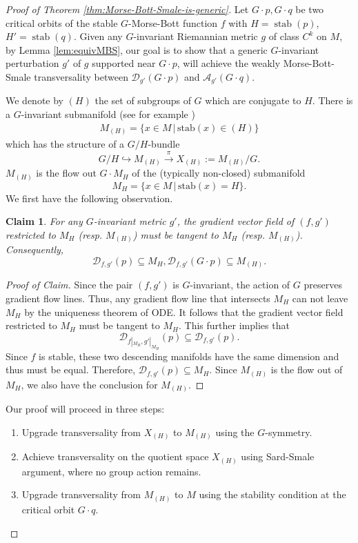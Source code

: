 \documentclass[11pt]{amsart}
\newtheorem{claim}[theorem]{Claim}
\theoremstyle{definition}
\numberwithin{equation}{subsection}
\DeclareMathOperator{\stab}{stab}
\newcommand{\des}{\mathscr{D}}
\newcommand{\asc}{\mathscr{A}}
\begin{document}
\begin{proof}[Proof of Theorem \ref{thm:Morse-Bott-Smale-is-generic}]
    Let \(G\cdot p,G\cdot q\) be two critical orbits of the stable $G$-Morse-Bott function $f$ with \(H=\stab(p)\), \(H'=\stab(q)\).  Given any \(G\)-invariant Riemannian metric \(g\) of class $C^k$ on \(M\), by Lemma \ref{lem:equivMBS}, our goal is to show that a generic \(G\)-invariant perturbation \(g'\) of \(g\) supported near \(G\cdot p\), will achieve the weakly Morse-Bott-Smale transversality between $\des_{g'}(G\cdot p)$ and $\asc_{g'}(G\cdot q)$. 
    
    We denote by $(H)$ the set of subgroups of $G$ which are conjugate to $H$. There is a $G$-invariant submanifold (see for example \cite[Section 1.5]{Groupactionnotes})
    \begin{align*}
        M_{(H)}=\{x\in M\,|\,\text{stab}(x)\in(H)\}
    \end{align*} which has the structure of a $G/H$-bundle  \[G/H\hookrightarrow M_{(H)}\xrightarrow{\pi} X_{(H)}:=M_{(H)}/G.\] $M_{(H)}$ is the flow out $G\cdot M_H$ of the (typically non-closed) submanifold \[M_H=\{x\in M\,|\,\text{stab}(x)=H\}.\]  We first have the following observation.
\begin{claim}\label{claim:invariant}
  For any $G$-invariant metric $g'$, the gradient vector field of $(f,g')$ restricted to $M_H$ (resp. $M_{(H)}$) must be tangent to $M_H$  (resp. $M_{(H)}$). Consequently, \[\des_{f,g'}(p)\subseteq M_H, \des_{f,g'}(G\cdot p)\subseteq M_{(H)}.\]
\end{claim}
\begin{proof}[Proof of Claim]
    Since the pair $(f,g')$ is $G$-invariant, the action of $G$ preserves gradient flow lines. Thus, any gradient flow line that intersects $M_H$ can not leave $M_H$ by the uniqueness theorem of ODE. It follows that the gradient vector field restricted to $M_H$ must be tangent to $M_H$. This further implies that \[\des_{f|_{M_H},g'|_{M_H}}(p)\subseteq \des_{f,g'}(p).\] Since $f$ is stable, these two descending manifolds have the same dimension and thus must be equal. Therefore, $\des_{f,g'}(p)\subseteq M_H$. Since $M_{(H)}$ is the flow out of $M_H$, we also have the conclusion for $M_{(H)}$.
\end{proof}
    Our proof will proceed in three steps:
    \begin{enumerate}[label=\arabic*.]
       \item Upgrade transversality from $X_{(H)}$ to $M_{(H)}$ using the $G$-symmetry.
        \item Achieve transversality on the quotient space $X_{(H)}$ using Sard-Smale argument, where no group action remains.
        \item Upgrade transversality from $M_{(H)}$ to $M$ using the stability condition at the critical orbit $G\cdot q$.
    \end{enumerate}


\end{proof}
\end{document}
